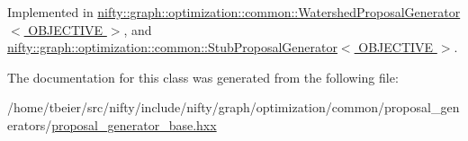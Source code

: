 Implemented in \hyperlink{classnifty_1_1graph_1_1optimization_1_1common_1_1WatershedProposalGenerator_a24691eed151a87476d7e5152c2f7b918}{nifty\+::graph\+::optimization\+::common\+::\+Watershed\+Proposal\+Generator$<$ O\+B\+J\+E\+C\+T\+I\+V\+E $>$}, and \hyperlink{classnifty_1_1graph_1_1optimization_1_1common_1_1StubProposalGenerator_ab8e44457d2c33326221b2291e4ff0246}{nifty\+::graph\+::optimization\+::common\+::\+Stub\+Proposal\+Generator$<$ O\+B\+J\+E\+C\+T\+I\+V\+E $>$}.



The documentation for this class was generated from the following file\+:\begin{DoxyCompactItemize}
\item 
/home/tbeier/src/nifty/include/nifty/graph/optimization/common/proposal\+\_\+generators/\hyperlink{common_2proposal__generators_2proposal__generator__base_8hxx}{proposal\+\_\+generator\+\_\+base.\+hxx}\end{DoxyCompactItemize}
